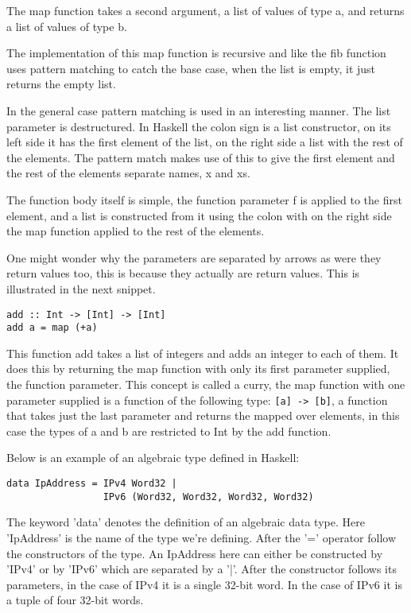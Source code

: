 The map function takes a second argument, a list of values of type a, and returns a list of values of type b. 

The implementation of this map function is recursive and like the fib function uses pattern matching to catch the base case, when the list is empty, it just returns the empty list.

In the general case pattern matching is used in an interesting manner. The list parameter is destructured. In Haskell the colon sign is a list constructor, on its left side it has the first element of the list, on the right side a list with the rest of the elements. The pattern match makes use of this to give the first element and the rest of the elements separate names, x and xs.

The function body itself is simple, the function parameter f is applied to the first element, and a list is constructed from it using the colon with on the right side the map function applied to the rest of the elements.

One might wonder why the parameters are separated by arrows as were they return values too, this is because they actually are return values. This is illustrated in the next snippet. 

\begin{lstlisting}[caption={The map function}]
add :: Int -> [Int] -> [Int]
add a = map (+a)
\end{lstlisting}

This function add takes a list of integers and adds an integer to each of them. It does this by returning the map function with only its first parameter supplied, the function parameter. This concept is called a curry, the map function with one parameter supplied is a function of the following type: \lstinline{[a] -> [b]}, a function that takes just the last parameter and returns the mapped over elements, in this case the types of a and b are restricted to Int by the add function.


Below is an example of an algebraic type defined in Haskell:

\begin{lstlisting}[caption={IP address type}]
data IpAddress = IPv4 Word32 |
                 IPv6 (Word32, Word32, Word32, Word32)
\end{lstlisting}

The keyword 'data' denotes the definition of an algebraic data type. Here 'IpAddress' is the name of the type we're defining.
After the '=' operator follow the constructors of the type. An IpAddress here can either be constructed by 'IPv4' or by 'IPv6' which are separated by a '|'.
After the constructor follows its parameters, in the case of IPv4 it is a single 32-bit word. In the case of IPv6 it is a tuple of four 32-bit words.

